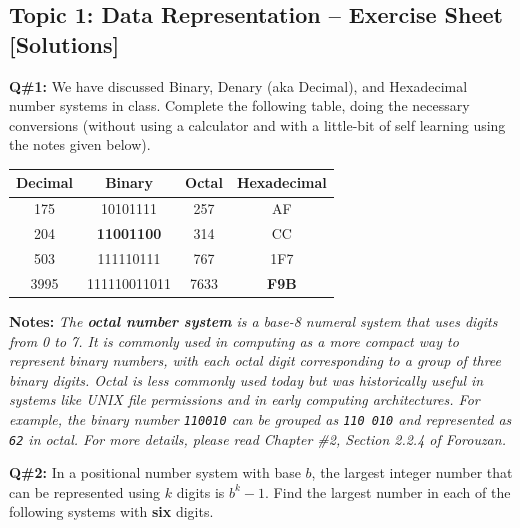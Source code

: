 \subsection{Topic 1: Data Representation – Exercise Sheet [Solutions]}

\textbf{Q\#1:} We have discussed Binary, Denary (aka Decimal), and Hexadecimal number systems in class. Complete the following table, doing the necessary conversions (without using a calculator and with a little-bit of self learning using the notes given below).\\[10pt]

\begin{center}
\renewcommand{\arraystretch}{1.5}
\begin{tabular}{|c|c|c|c|}
\hline
\textbf{Decimal} & \textbf{Binary} & \textbf{Octal} & \textbf{Hexadecimal} \\
\hline
175 & 10101111 & 257 & AF \\
\hline
204 & \textbf{11001100} & 314 & CC \\
\hline
503 & 111110111 & 767 & 1F7 \\
\hline
3995 & 111110011011 & 7633 & \textbf{F9B} \\
\hline
\end{tabular}
\end{center}

\vspace{1em}

\textbf{Notes:} \textit{The \textbf{octal number system} is a base-8 numeral system that uses digits from 0 to 7. It is commonly used in computing as a more compact way to represent binary numbers, with each octal digit corresponding to a group of three binary digits. Octal is less commonly used today but was historically useful in systems like UNIX file permissions and in early computing architectures. For example, the binary number \texttt{110010} can be grouped as \texttt{110 010} and represented as \texttt{62} in octal. For more details, please read \textit{Chapter \#2, Section 2.2.4} of \textit{Forouzan}.}

\vspace{1.5em}

\textbf{Q\#2:} In a positional number system with base $b$, the largest integer number that can be represented using $k$ digits is $b^k - 1$. Find the largest number in each of the following systems with \textbf{six} digits.

